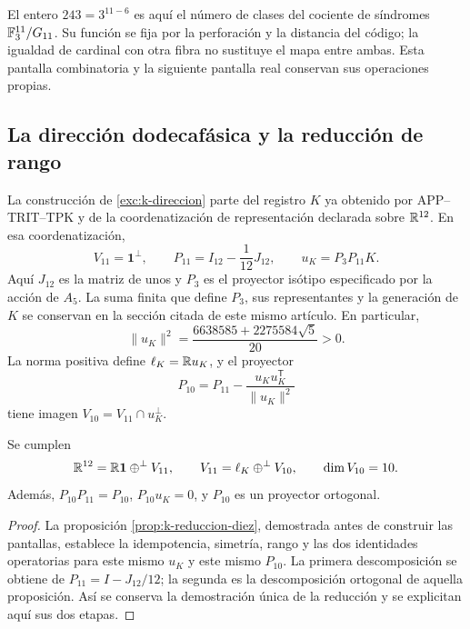 El entero \(243=3^{11-6}\) es aquí el número de clases
del cociente de síndromes \(\mathbb F_3^{11}/G_{11}\). Su
función se fija por la perforación y la distancia del
código; la igualdad de cardinal con otra fibra no sustituye
el mapa entre ambas. Esta pantalla combinatoria y la
siguiente pantalla real conservan sus operaciones propias.

\subsection{La dirección dodecafásica y la reducción de rango}

La construcción de \ref{exc:k-direccion} parte del registro
\(K\) ya obtenido por APP--TRIT--TPK y de la coordenatización de
representación declarada sobre \(\mathbb R^{12}\). En esa coordenatización,
\begin{equation}
 V_{11}=\mathbf1^\perp,\qquad
 P_{11}=I_{12}-\frac1{12}J_{12},\qquad
 u_K=P_3P_{11}K.
 \label{iv:eq:p11-uk}
\end{equation}
Aquí \(J_{12}\) es la matriz de unos y \(P_3\) es el
proyector isótipo especificado por la acción de \(A_5\).
La suma finita que define \(P_3\), sus representantes y la
generación de \(K\) se conservan en la sección citada de
este mismo artículo. En particular,
\[
 \|u_K\|^2=\frac{6638585+2275584\sqrt5}{20}>0.
\]
La norma positiva define \(\ell_K=\mathbb R u_K\), y el
proyector
\begin{equation}
 P_{10}=P_{11}-\frac{u_Ku_K^{\mathsf T}}{\|u_K\|^2}
 \label{iv:eq:p10}
\end{equation}
tiene imagen \(V_{10}=V_{11}\cap u_K^\perp\).

\begin{proposition}
\label{iv:prop:12-11-10}
Se cumplen
\[
 \mathbb R^{12}=\mathbb R\mathbf1\mathbin{\oplus^\perp}V_{11},\qquad
 V_{11}=\ell_K\mathbin{\oplus^\perp}V_{10},\qquad
 \dim V_{10}=10.
\]
Además, \(P_{10}P_{11}=P_{10}\), \(P_{10}u_K=0\), y
\(P_{10}\) es un proyector ortogonal.
\end{proposition}
\begin{proof}
La proposición \ref{prop:k-reduccion-diez}, demostrada antes de
construir las pantallas, establece la idempotencia, simetría, rango y
las dos identidades operatorias para este mismo \(u_K\) y este mismo
\(P_{10}\). La primera descomposición se obtiene de
\(P_{11}=I-J_{12}/12\); la segunda es la descomposición ortogonal
de aquella proposición. Así se conserva la demostración única de la
reducción y se explicitan aquí sus dos etapas.
\end{proof}

